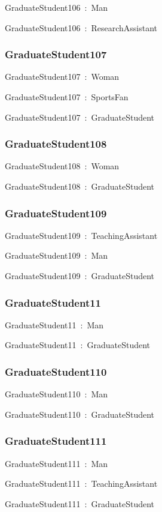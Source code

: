 \documentclass{article}
\begin{document}
GraduateStudent106~:~Man

GraduateStudent106~:~ResearchAssistant

\subsubsection*{GraduateStudent107}

GraduateStudent107~:~Woman

GraduateStudent107~:~SportsFan

GraduateStudent107~:~GraduateStudent

\subsubsection*{GraduateStudent108}

GraduateStudent108~:~Woman

GraduateStudent108~:~GraduateStudent

\subsubsection*{GraduateStudent109}

GraduateStudent109~:~TeachingAssistant

GraduateStudent109~:~Man

GraduateStudent109~:~GraduateStudent

\subsubsection*{GraduateStudent11}

GraduateStudent11~:~Man

GraduateStudent11~:~GraduateStudent

\subsubsection*{GraduateStudent110}

GraduateStudent110~:~Man

GraduateStudent110~:~GraduateStudent

\subsubsection*{GraduateStudent111}

GraduateStudent111~:~Man

GraduateStudent111~:~TeachingAssistant

GraduateStudent111~:~GraduateStudent
\end{document}
